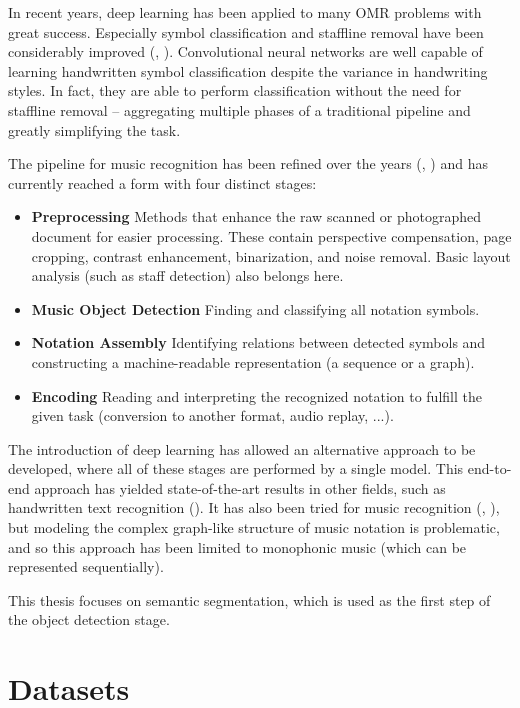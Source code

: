 In recent years, deep learning has been applied to many OMR problems with great success. Especially symbol classification and staffline removal have been considerably improved (\cite{StafflineDetection}, \cite{PachaClassification}). Convolutional neural networks are well capable of learning handwritten symbol classification despite the variance in handwriting styles. In fact, they are able to perform classification without the need for staffline removal -- aggregating multiple phases of a traditional pipeline and greatly simplifying the task.

The pipeline for music recognition has been refined over the years (\cite{BainbridgeBell}, \cite{RebeloSota}) and has currently reached a form with four distinct stages:

\begin{itemize}
    \item \textbf{Preprocessing} Methods that enhance the raw scanned or photographed document for easier processing. These contain perspective compensation, page cropping, contrast enhancement, binarization, and noise removal. Basic layout analysis (such as staff detection) also belongs here.
    \item \textbf{Music Object Detection} Finding and classifying all notation symbols.
    \item \textbf{Notation Assembly} Identifying relations between detected symbols and constructing a machine-readable representation (a sequence or a graph).
    \item \textbf{Encoding} Reading and interpreting the recognized notation to fulfill the given task (conversion to another format, audio replay, ...).
\end{itemize}

The introduction of deep learning has allowed an alternative approach to be developed, where all of these stages are performed by a single model. This end-to-end approach has yielded state-of-the-art results in other fields, such as handwritten text recognition (\cite{Scheidl}). It has also been tried for music recognition (\cite{Primus}, \cite{Mayer}), but modeling the complex graph-like structure of music notation is problematic, and so this approach has been limited to monophonic music (which can be represented sequentially).

This thesis focuses on semantic segmentation, which is used as the first step of the object detection stage.


\section{Datasets}
\label{sec:Datasets}

